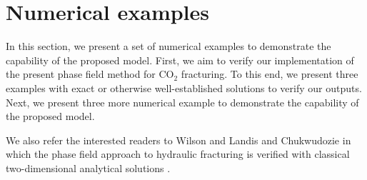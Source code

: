 \section{Numerical examples}
\label{sec:num-examples}

{In this section, we present a set of numerical examples to demonstrate the capability of the proposed model. First, we aim to verify our implementation of the present phase field method for CO$_2$ fracturing. To this end, we present three examples with exact or otherwise well-established solutions to verify our outputs. Next, we present three more numerical example to demonstrate the capability of the proposed model. }
	
	{We also refer the interested readers to Wilson and Landis \cite{wilson2016phase} and Chukwudozie \cite{chukwudozie2016application} in which the phase field approach to hydraulic fracturing is verified with classical two-dimensional analytical solutions \cite{detournay2003near,hu2010plane}.}





